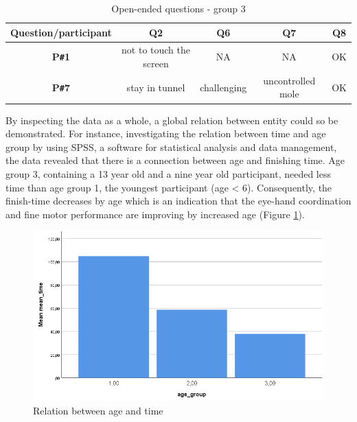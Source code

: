 \begin{table}[!ht]
    \centering
    \begin{tabular}{c|c|c|c|c}
    \hline
    \multicolumn{1}{|c|}{\textbf{Question/participant}} &
    \multicolumn{1}{c|}{\textbf{Q2}} &
    \multicolumn{1}{c|}{\textbf{Q6}} &
    \multicolumn{1}{c|}{\textbf{Q7}} &
    \multicolumn{1}{c|}{\textbf{Q8}} \\ \hline
    \multicolumn{1}{|c|}{\textbf{P\texttt{\#}1}} &
    \multicolumn{1}{c|}{not to touch the screen} &
    \multicolumn{1}{c|}{NA} &
    \multicolumn{1}{c|}{NA} &
    \multicolumn{1}{c|}{OK} \\ \hline
    \multicolumn{1}{|c|}{\textbf{P\texttt{\#}7}} &
    \multicolumn{1}{c|}{stay in tunnel} &
    \multicolumn{1}{c|}{challenging} &
    \multicolumn{1}{c|}{uncontrolled mole} &
    \multicolumn{1}{c|}{OK} \\ \hline
    \end{tabular}
    \caption{Open-ended questions - group 3}
    \label{tab:openendedquestiongroup3}
\end{table}


By inspecting the data as a whole, a global relation between entity could so be demonstrated. For instance, investigating the relation between time and age group by using SPSS, a software for statistical analysis and data management, the data revealed that there is a connection between age and finishing time. Age group 3, containing a 13 year old and a nine year old participant, needed less time than age group 1, the youngest participant (age < 6). Consequently, the finish-time decreases by age which is an indication that the eye-hand coordination and fine motor performance are improving by increased age (Figure \ref{fig:relationTimeAge}).

\begin{figure}[!ht]
    \centering
    \includegraphics[width=.6\textwidth]{figures/relationTimeAge.png}
    \caption{Relation between age and time}
    \label{fig:relationTimeAge}
\end{figure}

